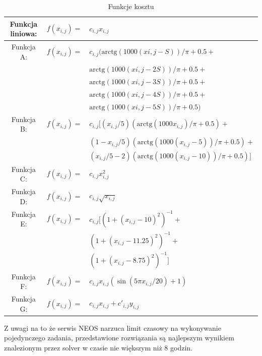 \begin{table}[H]
    \begin{center}
        \begin{tabular}{ccl}
            Funkcja liniowa: & $f(x_{i,j})=$ & $c_{i,j} x_{i,j}$ \\
            \hline
            Funkcja A: & $f(x_{i,j})=$ & $c_{i,j}(\text{arctg}(1000 (x {i,j} - S))/\pi + 0.5 +$ \\
            & & $\text{arctg}(1000 (x {i,j} - 2 S))/\pi + 0.5 +$ \\
            & & $\text{arctg}(1000 (x {i,j} - 3 S))/\pi + 0.5 +$ \\
            & & $\text{arctg}(1000 (x {i,j} - 4 S))/\pi + 0.5 +$ \\
            & & $\text{arctg}(1000 (x {i,j} - 5 S))/\pi + 0.5)$ \\ 
            \hline
            Funkcja B: & $f(x_{i,j})=$ & $c_{i,j}[(x_{i,j}/5) (\text{arctg}(1000 x_{i,j})/\pi + 0.5) +$ \\
            & & $(1 - x_{i,j}/5) (\text{arctg}(1000(x_{i,j} - 5))/\pi + 0.5) +$ \\
            & & $(x_{i,j}/5 - 2) (\text{arctg}(1000(x_{i,j} - 10))/\pi + 0.5)]$ \\
            \hline
            Funkcja C: & $f(x_{i,j})=$ & $c_{i,j} x_{i,j}^2$ \\
            \hline
            Funkcja D: & $f(x_{i,j})=$ & $c_{i,j} \sqrt{x_{i,j}}$ \\
            \hline
            Funkcja E: & $f(x_{i,j})=$ & $c_{i,j}[(1 + (x_{i,j} - 10)^2)^{-1} +$ \\
            & & $(1 + (x_{i,j} - 11.25)^2)^{-1} +$ \\
            & & $(1 + (x_{i,j} - 8.75)^2)^{-1}]$ \\
            \hline
            Funkcja F: & $f(x_{i,j})=$ & $c_{i,j} x_{i,j} (\sin(5 \pi x_{i,j}/20) + 1)$ \\
            \hline
            Funkcja G: & $f(x_{i,j})=$ & $c_{i,j} x_{i,j} + c'_{i,j} y_{i,j}$ \\
        \end{tabular}
    \end{center}
    \caption{Funkcje kosztu}
    \label{funkcje-kosztu}
\end{table}

Z uwagi na to że serwis NEOS narzuca limit czasowy na wykonywanie pojedynczego zadania, przedstawione rozwiązania są najlepszym wynikiem znalezionym 
przez solver w czasie nie większym niż 8 godzin.


